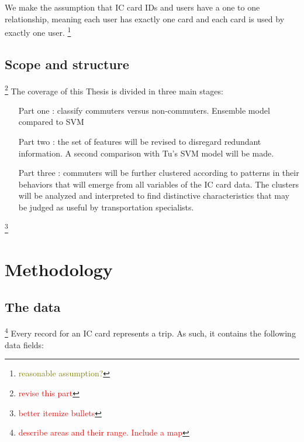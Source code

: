\documentclass{article}
\newcommand{\selfnote}[1]{\footnote{\textcolor{red}{#1}}}
\newcommand{\Liangdoubt}[1]{\footnote{\textcolor{olive}{#1}}}
\begin{document}
We make the assumption that IC card IDs and users have a one to one relationship, meaning each user has exactly one card and each card is used by exactly one user. \Liangdoubt{reasonable assumption?}

\subsection{Scope and structure}
\selfnote{revise this part}
The coverage of this Thesis is divided in three main stages: 

\begin{itemize}
\item[Part one]: classify commuters versus non-commuters. Ensemble model compared to SVM

\item[Part two]: the set of features will be revised to disregard redundant information. A second comparison with Tu\cite{tu2016impact}'s SVM model will be made. 

\item[Part three]: commuters will be further clustered according to patterns in their behaviors that will emerge from all variables of the IC card data. The clusters will be analyzed and interpreted to find distinctive characteristics that may be judged as useful by transportation specialists. 
\end{itemize}

\selfnote{better itemize bullets}


\newpage
\section{Methodology}
\subsection{The data}
\label{sec:data}
\selfnote{describe areas and their range. Include a map}
Every record for an IC card represents a trip. As such, it contains the following data fields:
\end{document}
